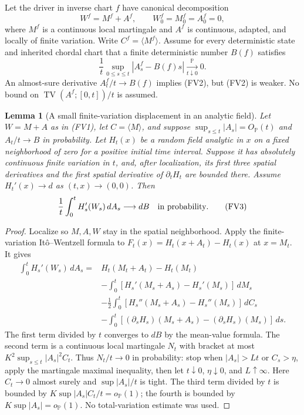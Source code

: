 \documentclass[11pt]{article}
\newtheorem{lemma}[theorem]{Lemma}
\theoremstyle{definition}\newtheorem{definition}[theorem]{Definition}
\theoremstyle{remark}\newtheorem{remark}[theorem]{Remark}
\begin{document}
Let the driver in inverse chart $f$ have canonical decomposition
\[
 W^f=M^f+A^f,\qquad W^f_0=M^f_0=A^f_0=0,
 \tag{FV1}
\]
where $M^f$ is a continuous local martingale and $A^f$ is continuous,
adapted, and locally of finite variation. Write $C^f=\langle M^f\rangle$.
Assume for every deterministic state and inherited chordal chart that a
finite deterministic number $B(f)$ satisfies
\[
 \frac{1}{t}\sup_{0\le s\le t}|A^f_s-B(f)s|
       \xrightarrow[t\downarrow0]{\mathbb P}0.
 \tag{FV2}
\]
An almost-sure derivative $A^f_t/t\to B(f)$ implies (FV2), but (FV2)
is weaker. No bound on $\operatorname{TV}(A^f;[0,t])/t$ is assumed.

\begin{lemma}[A small finite-variation displacement in an analytic field]
\label{lem:fv-analytic-displacement}
Let $W=M+A$ as in (FV1), let $C=\langle M\rangle$, and suppose
$\sup_{s\le t}|A_s|=O_{\mathbb P}(t)$ and $A_t/t\to B$ in probability.
Let $H_t(x)$ be a random field analytic in $x$ on a fixed neighborhood of
zero for a positive initial time interval. Suppose it has absolutely
continuous finite variation in $t$, and, after localization, its first three
spatial derivatives and the first spatial derivative of $\partial_tH_t$
are bounded there. Assume $H_t'(x)\to d$ as $(t,x)\to(0,0)$.
Then
\[
 \frac1t\int_0^t H_s'(W_s)\,dA_s\longrightarrow dB
       \quad\hbox{in probability}.
 \tag{FV3}
\]
\end{lemma}
\begin{proof}
Localize so $M,A,W$ stay in the spatial neighborhood. Apply the
finite-variation It\^o--Wentzell formula to
$F_t(x)=H_t(x+A_t)-H_t(x)$ at $x=M_t$. It gives
\begin{align*}
 \int_0^tH_s'(W_s)\,dA_s
 ={}&H_t(M_t+A_t)-H_t(M_t)\\
 &-\int_0^t[H_s'(M_s+A_s)-H_s'(M_s)]\,dM_s\\
 &-\frac12\int_0^t[H_s''(M_s+A_s)-H_s''(M_s)]\,dC_s\\
 &-\int_0^t[(\partial_sH_s)(M_s+A_s)
                  -(\partial_sH_s)(M_s)]\,ds.
\end{align*}
The first term divided by $t$ converges to $dB$ by the mean-value formula.
The second term is a continuous local martingale $N_t$ with bracket at
most $K^2\sup_{s\le t}|A_s|^2 C_t$. Thus $N_t/t\to0$ in probability:
stop when $|A_s|>Lt$ or $C_s>\eta$, apply the martingale maximal
inequality, then let $t\downarrow0$, $\eta\downarrow0$, and $L\uparrow\infty$.
Here $C_t\to0$ almost surely and $\sup|A_s|/t$ is tight. The third term
divided by $t$ is bounded by
$K\sup|A_s|C_t/t=o_{\mathbb P}(1)$; the fourth is bounded by
$K\sup|A_s|=o_{\mathbb P}(1)$. No total-variation estimate was used.
\end{proof}
\end{document}
